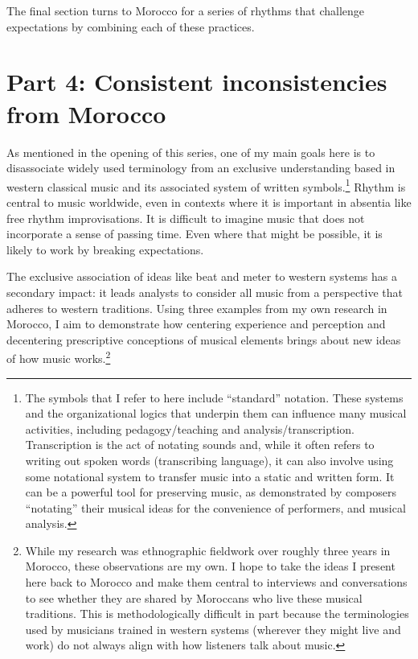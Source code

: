 \documentclass[twoside]{article}
\begin{document}
The final section turns to Morocco for a series of rhythms that
challenge expectations by combining each of these practices.

\hypertarget{part-4-consistent-inconsistencies-from-morocco}{%
\section*{Part 4: Consistent inconsistencies from
Morocco}\label{part-4-consistent-inconsistencies-from-morocco}}

As mentioned in the opening of this series, one of my main goals here is
to disassociate widely used terminology from an exclusive understanding
based in western classical music and its associated system of written
symbols.\footnote{The symbols that I refer to here include ``standard''
  notation. These systems and the organizational logics that underpin
  them can influence many musical activities, including
  pedagogy/teaching and analysis/transcription. Transcription is the act
  of notating sounds and, while it often refers to writing out spoken
  words (transcribing language), it can also involve using some
  notational system to transfer music into a static and written form. It
  can be a powerful tool for preserving music, as demonstrated by
  composers ``notating'' their musical ideas for the convenience of
  performers, and musical analysis.} Rhythm is central to music
worldwide, even in contexts where it is important in absentia like free
rhythm improvisations. It is difficult to imagine music that does not
incorporate a sense of passing time. Even where that might be possible,
it is likely to work by breaking expectations.

The exclusive association of ideas like beat and meter to western
systems has a secondary impact: it leads analysts to consider all music
from a perspective that adheres to western traditions. Using three
examples from my own research in Morocco, I aim to demonstrate how
centering experience and perception and decentering prescriptive
conceptions of musical elements brings about new ideas of how music
works.\footnote{While my research was ethnographic fieldwork over
  roughly three years in Morocco, these observations are my own. I hope
  to take the ideas I present here back to Morocco and make them central
  to interviews and conversations to see whether they are shared by
  Moroccans who live these musical traditions. This is methodologically
  difficult in part because the terminologies used by musicians trained
  in western systems (wherever they might live and work) do not always
  align with how listeners talk about music.}
\end{document}
